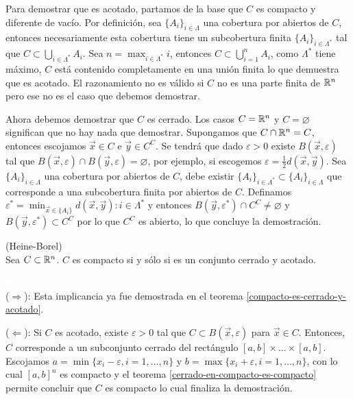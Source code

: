 \begin{demostracion} Para demostrar que es acotado, partamos de la base que $C$ es compacto y diferente de vac\'io. Por definici\'on, sea $\{A_i\}_{i\in \Lambda}$ una cobertura por abiertos de $C$, entonces necesariamente esta cobertura tiene un subcobertura finita $\{A_i\}_{i\in \Lambda^*}$ tal que $C \subset \bigcup_{i \in \Lambda^*} A_i$. Sea $n = \max_{i \in \Lambda^*} i$, entonces $C \subset \bigcup_{i=1}^n A_i$, como $\Lambda^*$ tiene m\'aximo, $C$ est\'a contenido completamente en una uni\'on finita lo que demuestra que es acotado. El razonamiento no es v\'alido si $C$ no es una parte finita de $\mathbb{R}^n$ pero ese no es el caso que debemos demostrar.

Ahora debemos demostrar que $C$ es cerrado. Los casos $C = \mathbb{R}^n$ y $C = \varnothing$ significan que no hay nada que demostrar. Supongamos que $C \cap \mathbb{R}^n = C$, entonces escojamos $\vec{x} \in C$ e $\vec{y} \in C^C$. Se tendr\'a que dado $\varepsilon > 0$ existe $B(\vec{x},\varepsilon)$ tal que $B(\vec{x},\varepsilon) \cap B(\vec{y},\varepsilon) = \varnothing$, por ejemplo, si escogemos $\varepsilon = \frac{1}{2} d(\vec{x},\vec{y})$. Sea $\{A_i\}_{i\in \Lambda}$ una cobertura por abiertos de $C$, debe existir $\{A_i\}_{i\in \Lambda^*} \subset \{A_i\}_{i\in \Lambda}$ que corresponde a una subcobertura finita por abiertos de $C$. Definamos $\varepsilon^* = \min_{\vec{x}\in \{A_i\}} d(\vec{x},\vec{y}): i\in \Lambda^*$ y entonces $B(\vec{y},\varepsilon^*) \cap C^C \neq \varnothing$ y $B(\vec{y},\varepsilon^*) \subset C^C$ por lo que $C^C$ es abierto, lo que  concluye la demostraci\'on.
\end{demostracion}

\begin{teorema}{\rm (Heine-Borel)}
\\Sea $C\subset \mathbb{R}^n$. $C$ es compacto si y s\'olo si es un conjunto cerrado y acotado.
\end{teorema}

\begin{demostracion}\textcolor{white}{linea en blanco}\\
($\Rightarrow$): Esta implicancia ya fue demostrada en el teorema \ref{compacto-es-cerrado-y-acotado}.

($\Leftarrow$): Si $C$ es acotado, existe $\varepsilon > 0$ tal que $C \subset B(\vec{x},\varepsilon)$ para $\vec{x}\in C$. Entonces, $C$ corresponde a un subconjunto cerrado del rect\'angulo $[a,b]\times \ldots \times [a,b]$. Escojamos $a=\min\{x_i - \varepsilon , i ={1,\ldots , n}\}$ y $b=\max\{x_i + \varepsilon , i =1,\ldots , n\}$, con lo cual $[a,b]^n$ es compacto y el teorema \ref{cerrado-en-compacto-es-compacto} permite concluir que $C$ es compacto lo cual finaliza la demostraci\'on.
\end{demostracion}


